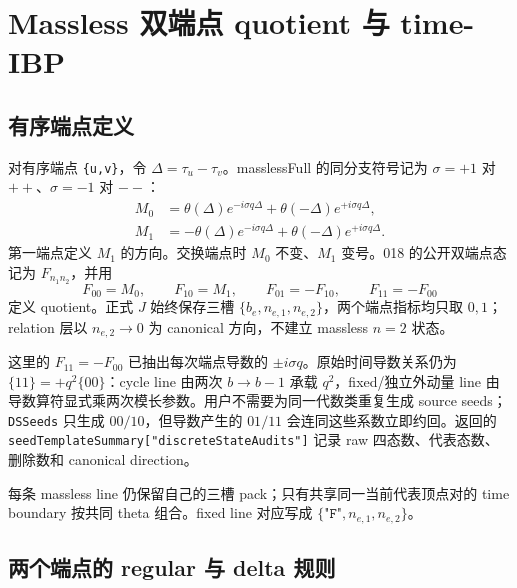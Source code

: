 ﻿\documentclass[a4paper,11pt]{article}
\begin{document}
\section{Massless 双端点 quotient 与 time-IBP}

\subsection{有序端点定义}

对有序端点 \texttt{\{u,v\}}，令 $\Delta=\tau_u-\tau_v$。masslessFull 的同分支符号记为 $\sigma=+1$ 对 $++$、$\sigma=-1$ 对 $--$：
\begin{align}
 M_0&=\theta(\Delta)e^{-i\sigma q\Delta}
      +\theta(-\Delta)e^{+i\sigma q\Delta},\\
 M_1&=-\theta(\Delta)e^{-i\sigma q\Delta}
      +\theta(-\Delta)e^{+i\sigma q\Delta}.
 \label{masslessM01}
\end{align}
第一端点定义 $M_1$ 的方向。交换端点时 $M_0$ 不变、$M_1$ 变号。018 的公开双端点态记为 $F_{n_1n_2}$，并用
\begin{equation}
 F_{00}=M_0,\qquad F_{10}=M_1,\qquad
 F_{01}=-F_{10},\qquad F_{11}=-F_{00}
 \label{masslessDoubleEndpoint}
\end{equation}
定义 quotient。正式 $J$ 始终保存三槽 $\{b_e,n_{e,1},n_{e,2}\}$，两个端点指标均只取 $0,1$；relation 层以 $n_{e,2}\to0$ 为 canonical 方向，不建立 massless $n=2$ 状态。

这里的 $F_{11}=-F_{00}$ 已抽出每次端点导数的 $\pm i\sigma q$。原始时间导数关系仍为 $\{11\}=+q^2\{00\}$：cycle line 由两次 $b\to b-1$ 承载 $q^2$，fixed/独立外动量 line 由导数算符显式乘两次模长参数。用户不需要为同一代数类重复生成 source seeds；\texttt{DSSeeds} 只生成 $00/10$，但导数产生的 $01/11$ 会连同这些系数立即约回。返回的 \texttt{seedTemplateSummary["discreteStateAudits"]} 记录 raw 四态数、代表态数、删除数和 canonical direction。

每条 massless line 仍保留自己的三槽 pack；只有共享同一当前代表顶点对的 time boundary 按共同 theta 组合。fixed line 对应写成 $\{\texttt{"F"},n_{e,1},n_{e,2}\}$。

\subsection{两个端点的 regular 与 delta 规则}
\end{document}
